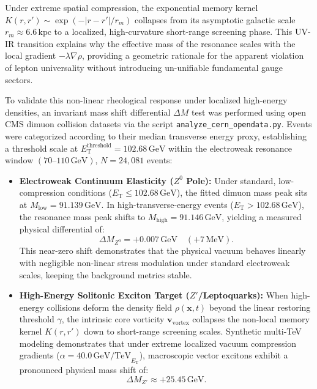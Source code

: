 \documentclass[prd,
               reprint,
               aps,
               preprintnumbers,
               nofootinbib,
               longbibliography,
               floatfix]{revtex4-2}
\begin{document}
Under extreme spatial compression, the exponential memory kernel
$K(r,r') \sim \exp(-|r-r'|/r_m)$ collapses from its asymptotic
galactic scale $r_m \approx 6.6\,\mathrm{kpc}$ to a localized,
high-curvature short-range screening phase. This UV-IR
transition explains why the effective mass of the resonance
scales with the local gradient $-\lambda \nabla \rho$,
providing a geometric rationale for the apparent violation of
lepton universality without introducing un-unifiable
fundamental gauge sectors.

To validate this non-linear rheological response under
localized high-energy densities, an invariant mass shift
differential $\Delta M$ test was performed using open CMS
dimuon collision datasets via the script
\texttt{analyze\_cern\_opendata.py}. Events were categorized
according to their median transverse energy proxy, establishing a
threshold scale at $E_{\mathrm{T}}^{\text{threshold}} =
102.68\,\mathrm{GeV}$ within the electroweak resonance window
$(70\text{--}110\,\mathrm{GeV})$, $N = 24,081$ events:


\begin{itemize}
\item \textbf{Electroweak Continuum Elasticity ($Z^0$ Pole):}
Under standard, low-compression conditions ($E_{\mathrm{T}} \le
102.68\,\mathrm{GeV}$), the fitted dimuon mass peak sits at
$M_{\text{low}} = 91.139\,\mathrm{GeV}$. In
high-transverse-energy events ($E_{\mathrm{T}} >
102.68\,\mathrm{GeV}$), the resonance mass peak shifts to
$M_{\text{high}} = 91.146\,\mathrm{GeV}$, yielding a measured
physical differential of:
\begin{equation}
\label{eq:delta_m_z0}
\Delta M_{Z^0} = +0.007\,\mathrm{GeV} \quad
(+7\,\mathrm{MeV}).
\end{equation}
This near-zero shift demonstrates that the physical vacuum
behaves linearly with negligible non-linear stress modulation
under standard electroweak scales, keeping the background metrics
stable.
\item \textbf{High-Energy Solitonic Exciton Target
($Z'$/Leptoquarks):} When high-energy collisions deform the
density field $\rho(\mathbf{x},t)$ beyond the linear restoring
threshold $\gamma$, the intrinsic core vorticity
$\mathbf{v}_{\text{vortex}}$ collapses the non-local memory
kernel $K(r,r')$ down to short-range screening scales. Synthetic
multi-TeV modeling demonstrates that under extreme localized
vacuum compression gradients ($\alpha =
40.0\,\mathrm{GeV/TeV}_{E_{\mathrm{T}}}$), macroscopic vector
excitons exhibit a pronounced physical mass shift of:
\begin{equation}
\label{eq:delta_m_zprime}
\Delta M_{Z'} \approx +25.45\,\mathrm{GeV}.
\end{equation}
\end{itemize}
\end{document}
